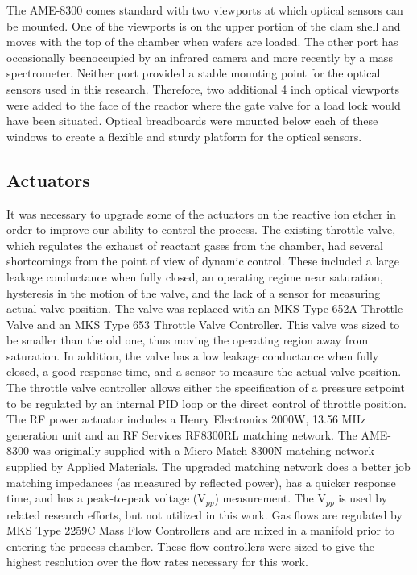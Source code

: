 The AME-8300 comes standard with two viewports at which optical sensors can be mounted. One of the viewports is on the upper portion of the clam shell and moves with the top of the chamber when wafers are loaded. The other port has occasionally beenoccupied by an infrared camera and more recently by a mass spectrometer. Neither port provided a stable mounting point for the optical sensors used in this research. Therefore, two additional 4 inch optical viewports were added to the face of the reactor where the gate valve for a load lock would have been situated. Optical breadboards were mounted below each of these windows to create a flexible and sturdy platform for the optical sensors.


\subsection{Actuators}

\tab It was necessary to upgrade some of the actuators on the reactive ion etcher in order
to improve our ability to control the process. The existing throttle valve, which regulates
the exhaust of reactant gases from the chamber, had several shortcomings from the point
of view of dynamic control. These included a large leakage conductance when fully closed,
an operating regime near saturation, hysteresis in the motion of the valve, and the lack of
a sensor for measuring actual valve position. The valve was replaced with an MKS Type
652A Throttle Valve and an MKS Type 653 Throttle Valve Controller. This valve was sized
to be smaller than the old one, thus moving the operating region away from saturation. In
addition, the valve has a low leakage conductance when fully closed, a good response time,
and a sensor to measure the actual valve position. The throttle valve controller allows
either the specification of a pressure setpoint to be regulated by an internal PID loop or
the direct control of throttle position. The RF power actuator includes a Henry Electronics
2000W, 13.56 MHz generation unit and an RF Services RF8300RL matching network. The
AME-8300 was originally supplied with a Micro-Match 8300N matching network supplied by
Applied Materials. The upgraded matching network does a better job matching impedances
(as measured by reflected power), has a quicker response time, and has a peak-to-peak
voltage ($\text{V}_{pp}$) measurement. The $\text{V}_{pp}$ is used by related research efforts, but not utilized in this work. Gas flows are regulated by MKS Type 2259C Mass Flow Controllers and are mixed in a manifold prior to entering the process chamber. These flow controllers were sized to give the highest resolution over the flow rates necessary for this work.

